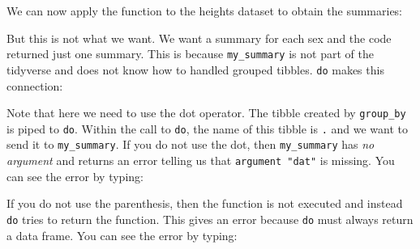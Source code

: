 \documentclass[
]{krantz}
\newenvironment{Shaded}{\begin{snugshade}}{\end{snugshade}}
\newcommand{\KeywordTok}[1]{\textcolor[rgb]{0.27,0.27,0.27}{\textbf{#1}}}
\newcommand{\NormalTok}[1]{#1}
\newcommand{\OperatorTok}[1]{\textcolor[rgb]{0.43,0.43,0.43}{\textbf{#1}}}
\newcommand{\StringTok}[1]{\textcolor[rgb]{0.5,0.5,0.5}{#1}}
\begin{document}
We can now apply the function to the heights dataset to obtain the summaries:

\begin{Shaded}
\end{Shaded}

But this is not what we want. We want a summary for each sex and the code returned just one summary. This is because \texttt{my\_summary} is not part of the tidyverse and does not know how to handled grouped tibbles. \texttt{do} makes this connection:

\begin{Shaded}
\end{Shaded}

Note that here we need to use the dot operator. The tibble created by \texttt{group\_by} is piped to \texttt{do}. Within the call to \texttt{do}, the name of this tibble is \texttt{.} and we want to send it to \texttt{my\_summary}. If you do not use the dot, then \texttt{my\_summary} has \emph{no argument} and returns an error telling us that \texttt{argument\ "dat"} is missing. You can see the error by typing:

\begin{Shaded}
\end{Shaded}

If you do not use the parenthesis, then the function is not executed and instead \texttt{do} tries to return the function. This gives an error because \texttt{do} must always return a data frame. You can see the error by typing:

\begin{Shaded}
\end{Shaded}
\end{document}
